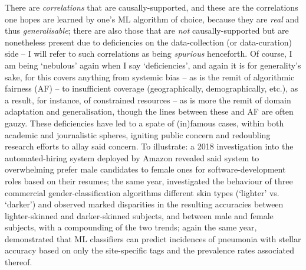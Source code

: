 %
There are \emph{correlations} that are causally-supported, and these are the correlations one hopes
are learned by one's ML algorithm of choice, because they are \emph{real} and thus
\emph{generalisable}; there are also those that are \emph{not} causally-supported but are
nonetheless present due to deficiencies on the data-collection (or data-curation) side -- I will
refer to such correlations as being \emph{spurious} henceforth.
%
Of course, I am being `nebulous' again when I say `deficiencies', and again it is for generality's
sake, for this covers anything from systemic bias -- as is the remit of algorithmic fairness (AF)
-- to insufficient coverage (geographically, demographically, etc.), as a result, for instance, of
constrained resources -- as is more the remit of domain adaptation and generalisation, though the
lines between these and AF are often gauzy.
%
These deficiencies have led to a spate of (in)famous cases, within both academic and journalistic
spheres, igniting public concern and redoubling research efforts to allay said concern.
%
To illustrate: a 2018 investigation \citep{dastin2018amazon} into the automated-hiring system
deployed by Amazon revealed said system to overwhelming prefer male candidates to female ones for
software-development roles based on their resumes; the same year, \cite{buolamwini2018gender}
investigated the behaviour of three commercial gender-classification algorithms \wrt{} different
skin types (`lighter' vs. `darker') and observed marked disparities in the resulting accuracies
between lighter-skinned and darker-skinned subjects, and between male and female subjects, with a
compounding of the two trends; again the same year, \cite{zech2018variable} demonstrated that
ML classifiers can predict incidences of pneumonia with stellar accuracy based on only the
site-specific tags and the prevalence rates associated thereof.

